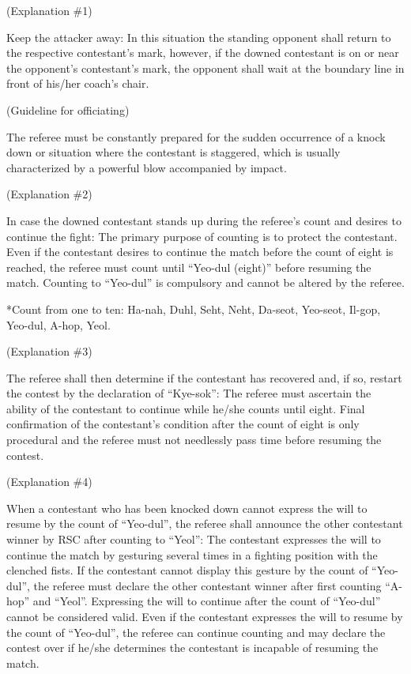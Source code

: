 \documentclass[
]{report}
\begin{document}
(Explanation \#1)

Keep the attacker away: In this situation the standing opponent shall
return to the respective contestant's mark, however, if the downed
contestant is on or near the opponent's contestant's mark, the opponent
shall wait at the boundary line in front of his/her coach's chair.

(Guideline for officiating)

The referee must be constantly prepared for the sudden occurrence of a
knock down or situation where the contestant is staggered, which is
usually characterized by a powerful blow accompanied by impact.

(Explanation \#2)

In case the downed contestant stands up during the referee's count and
desires to continue the fight: The primary purpose of counting is to
protect the contestant. Even if the contestant desires to continue the
match before the count of eight is reached, the referee must count until
``Yeo-dul (eight)'' before resuming the match. Counting to ``Yeo-dul''
is compulsory and cannot be altered by the referee.

*Count from one to ten: Ha-nah, Duhl, Seht, Neht, Da-seot, Yeo-seot,
Il-gop, Yeo-dul, A-hop, Yeol.

(Explanation \#3)

The referee shall then determine if the contestant has recovered and, if
so, restart the contest by the declaration of ``Kye-sok'': The referee
must ascertain the ability of the contestant to continue while he/she
counts until eight. Final confirmation of the contestant's condition
after the count of eight is only procedural and the referee must not
needlessly pass time before resuming the contest.

(Explanation \#4)

When a contestant who has been knocked down cannot express the will to
resume by the count of ``Yeo-dul'', the referee shall announce the other
contestant winner by RSC after counting to ``Yeol'': The contestant
expresses the will to continue the match by gesturing several times in a
fighting position with the clenched fists. If the contestant cannot
display this gesture by the count of ``Yeo-dul'', the referee must
declare the other contestant winner after first counting ``A-hop'' and
``Yeol''. Expressing the will to continue after the count of ``Yeo-dul''
cannot be considered valid. Even if the contestant expresses the will to
resume by the count of ``Yeo-dul'', the referee can continue counting
and may declare the contest over if he/she determines the contestant is
incapable of resuming the match.
\end{document}
